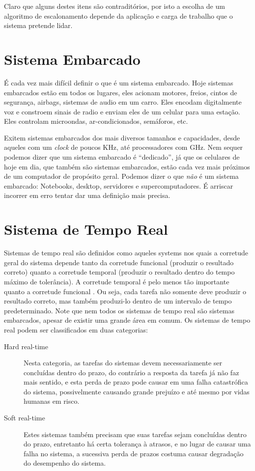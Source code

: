 Claro que alguns destes itens são contraditórios, por isto a escolha de um algoritmo de escalonamento depende da aplicação e carga de trabalho que o sistema pretende lidar.

\section{Sistema Embarcado}

É cada vez mais difícil definir o que é um sistema embarcado. Hoje sistemas embarcados estão em todos os lugares, eles acionam motores, freios, cintos de segurança, airbags, sistemas de audio em um carro. Eles encodam digitalmente voz e constroem sinais de radio e enviam eles de um celular para uma estação. Eles controlam microondas, ar-condicionados, semáforos, etc.

Exitem sistemas embarcados dos mais diversos tamanhos e capacidades, desde aqueles com um \emph{clock} de poucos KHz, até processadores com GHz. Nem sequer podemos dizer que um sistema embarcado é ``dedicado'', já que os celulares de hoje em dia, que também são sistemas embarcados, estão cada vez mais próximos de um computador de propósito geral. Podemos dizer o que \emph{não} é um sistema embarcado: Notebooks, desktop, servidores e supercomputadores. É arriscar incorrer em erro tentar dar uma definição mais precisa.

\section{Sistema de Tempo Real}

Sistemas de tempo real são definidos como aqueles systems nos quais a corretude geral do sistema depende tanto da corretude funcional (produzir o resultado correto) quanto a corretude temporal (produzir o resultado dentro do tempo máximo de tolerância). A corretude temporal é pelo menos tão importante quanto a corretude funcional \cite{realtime}. Ou seja, cada tarefa não somente deve produzir o resultado correto, mas também produzi-lo dentro de um intervalo de tempo predeterminado. Note que nem todos os sistemas de tempo real são sistemas embarcados, apesar de existir uma grande área em comum. Os sistemas de tempo real podem ser classificados em duas categorias:

\begin{description}
	\item[Hard real-time] Nesta categoria, as tarefas do sistemas devem necessariamente ser concluídas dentro do prazo, do contrário a resposta da tarefa já não faz mais sentido, e esta perda de prazo pode causar em uma falha catastrófica do sistema, possivelmente causando grande prejuízo e até mesmo por vidas humanas em risco.
	\item[Soft real-time] Estes sistemas também precisam que suas tarefas sejam concluídas dentro do prazo, entretanto há certa tolerança à atrasos, e no lugar de causar uma falha no sistema, a sucessiva perda de prazos costuma causar degradação do desempenho do sistema.
\end{description}

